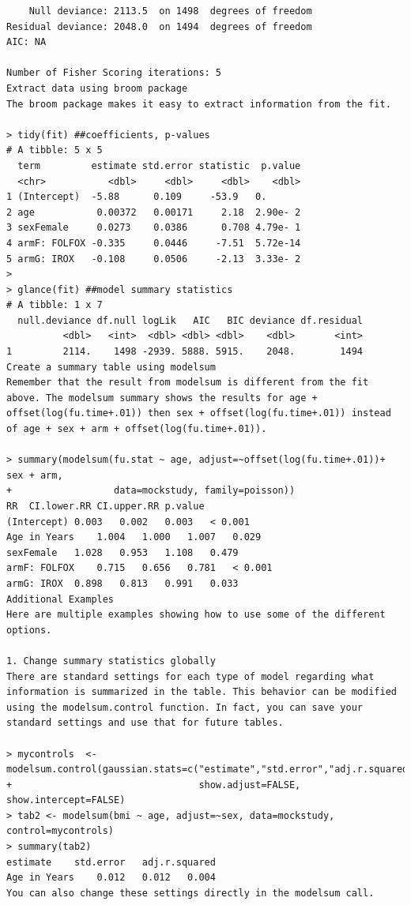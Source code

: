 \documentclass[
]{book}
\begin{document}
\begin{verbatim}
    Null deviance: 2113.5  on 1498  degrees of freedom
Residual deviance: 2048.0  on 1494  degrees of freedom
AIC: NA

Number of Fisher Scoring iterations: 5
Extract data using broom package
The broom package makes it easy to extract information from the fit.

> tidy(fit) ##coefficients, p-values
# A tibble: 5 x 5
  term         estimate std.error statistic  p.value
  <chr>           <dbl>     <dbl>     <dbl>    <dbl>
1 (Intercept)  -5.88      0.109     -53.9   0.      
2 age           0.00372   0.00171     2.18  2.90e- 2
3 sexFemale     0.0273    0.0386      0.708 4.79e- 1
4 armF: FOLFOX -0.335     0.0446     -7.51  5.72e-14
5 armG: IROX   -0.108     0.0506     -2.13  3.33e- 2
> 
> glance(fit) ##model summary statistics
# A tibble: 1 x 7
  null.deviance df.null logLik   AIC   BIC deviance df.residual
          <dbl>   <int>  <dbl> <dbl> <dbl>    <dbl>       <int>
1         2114.    1498 -2939. 5888. 5915.    2048.        1494
Create a summary table using modelsum
Remember that the result from modelsum is different from the fit above. The modelsum summary shows the results for age + offset(log(fu.time+.01)) then sex + offset(log(fu.time+.01)) instead of age + sex + arm + offset(log(fu.time+.01)).

> summary(modelsum(fu.stat ~ age, adjust=~offset(log(fu.time+.01))+ sex + arm, 
+                  data=mockstudy, family=poisson))
RR  CI.lower.RR CI.upper.RR p.value
(Intercept) 0.003   0.002   0.003   < 0.001
Age in Years    1.004   1.000   1.007   0.029
sexFemale   1.028   0.953   1.108   0.479
armF: FOLFOX    0.715   0.656   0.781   < 0.001
armG: IROX  0.898   0.813   0.991   0.033
Additional Examples
Here are multiple examples showing how to use some of the different options.

1. Change summary statistics globally
There are standard settings for each type of model regarding what information is summarized in the table. This behavior can be modified using the modelsum.control function. In fact, you can save your standard settings and use that for future tables.

> mycontrols  <- modelsum.control(gaussian.stats=c("estimate","std.error","adj.r.squared","Nmiss"),
+                                 show.adjust=FALSE, show.intercept=FALSE)                            
> tab2 <- modelsum(bmi ~ age, adjust=~sex, data=mockstudy, control=mycontrols)
> summary(tab2)
estimate    std.error   adj.r.squared
Age in Years    0.012   0.012   0.004
You can also change these settings directly in the modelsum call.


\end{verbatim}
\end{document}
